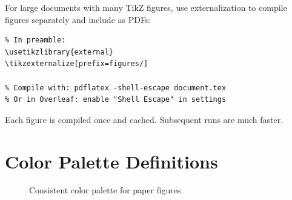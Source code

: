 \documentclass[12pt,a4paper]{article}
\begin{document}
For large documents with many TikZ figures, use externalization
to compile figures separately and include as PDFs:

\begin{verbatim}
% In preamble:
\usetikzlibrary{external}
\tikzexternalize[prefix=figures/]

% Compile with: pdflatex -shell-escape document.tex
% Or in Overleaf: enable "Shell Escape" in settings
\end{verbatim}

Each figure is compiled once and cached. Subsequent runs
are much faster.

\section{Color Palette Definitions}
\label{sec:colors}

\begin{figure}[htbp]
\centering
{}
\caption{Consistent color palette for paper figures}\label{fig:colors}
\end{figure}
\end{document}
